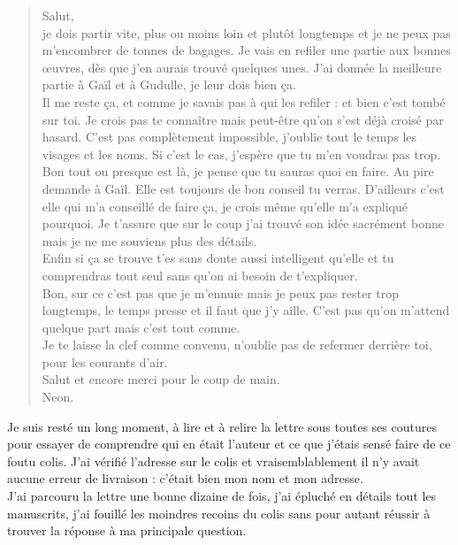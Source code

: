 \begin{quote}
Salut, \\

je dois partir vite, plus ou moins loin et plutôt longtemps et je ne peux pas m'encombrer de tonnes de bagages. Je vais en refiler une partie aux bonnes œuvres, dès que j'en aurais trouvé quelques unes. J'ai donnée la meilleure partie à Gaïl et à Gudulle, je leur dois bien ça. \\

Il me reste ça, et comme je savais pas à qui les refiler : et bien c'est tombé sur toi. Je crois pas te connaître mais peut-être qu'on s'est déjà croisé par hasard. C'est pas complètement impossible, j'oublie tout le temps les visages et les noms. Si c'est le cas, j'espère que tu m'en voudras pas trop. \\
Bon tout ou presque est là, je pense que tu sauras quoi en faire. Au pire demande à Gaïl. Elle est toujours de bon conseil tu verras. D'ailleurs c'est elle qui m'a conseillé de faire ça, je crois même qu'elle m'a expliqué pourquoi. Je t'assure que sur le coup j'ai trouvé son idée sacrément bonne mais je ne me souviens plus des détails. \\
Enfin si ça se trouve t'es sans doute aussi intelligent qu'elle et tu comprendras tout seul sans qu'on ai besoin de t'expliquer. \\

Bon, sur ce c'est pas que je m'ennuie mais je peux pas rester trop longtemps, le temps presse et il faut que j'y aille. C'est pas qu'on m'attend quelque part mais c'est tout comme.\\

Je te laisse la clef comme convenu, n'oublie pas de refermer derrière toi, pour les courants d'air.\\

Salut et encore merci pour le coup de main.\\
Neon.\\
\end{quote} 

Je suis resté un long moment, à lire et à relire la lettre sous toutes ses coutures pour essayer de comprendre qui en était l'auteur et ce que j'étais sensé faire de ce foutu colis. J'ai vérifié l'adresse sur le colis et vraisemblablement il n'y avait aucune erreur de livraison : c'était bien mon nom et mon adresse. \\

J'ai parcouru la lettre une bonne dizaine de fois, j'ai épluché en détails tout les manuscrits, j'ai fouillé les moindres recoins du colis sans pour autant réussir à trouver la réponse à ma principale question.\\

